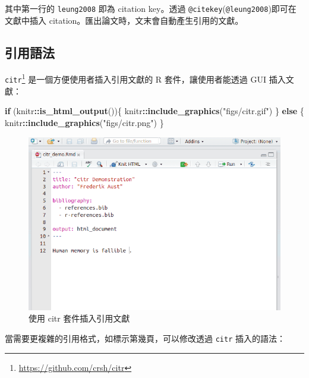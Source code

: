 \documentclass[oneside]{book}
\newenvironment{Shaded}{\begin{snugshade}}{\end{snugshade}}
\newcommand{\KeywordTok}[1]{\textcolor[rgb]{0.13,0.29,0.53}{\textbf{#1}}}
\newcommand{\StringTok}[1]{\textcolor[rgb]{0.31,0.60,0.02}{#1}}
\newcommand{\ControlFlowTok}[1]{\textcolor[rgb]{0.13,0.29,0.53}{\textbf{#1}}}
\newcommand{\OperatorTok}[1]{\textcolor[rgb]{0.81,0.36,0.00}{\textbf{#1}}}
\newcommand{\NormalTok}[1]{#1}
\renewcommand{\href}[2]{#2\footnote{\url{#1}}}
\theoremstyle{definition}
\theoremstyle{definition}
\theoremstyle{definition}
\theoremstyle{remark}
\begin{document}
其中第一行的 \texttt{leung2008} 即為 citation key。透過
\texttt{@citekey}(\texttt{@leung2008})即可在文獻中插入
citation。匯出論文時，文末會自動產生引用的文獻。

\subsection{引用語法}\label{cite-syntax}

\href{https://github.com/crsh/citr}{\texttt{citr}}
是一個方便使用者插入引用文獻的 R 套件，讓使用者能透過 GUI 插入文獻：

\begin{Shaded}
\begin{Highlighting}[]
\ControlFlowTok{if}\NormalTok{ (knitr}\OperatorTok{::}\KeywordTok{is_html_output}\NormalTok{())\{}
\NormalTok{  knitr}\OperatorTok{::}\KeywordTok{include_graphics}\NormalTok{(}\StringTok{"figs/citr.gif"}\NormalTok{)}
\NormalTok{\} }\ControlFlowTok{else}\NormalTok{ \{}
\NormalTok{  knitr}\OperatorTok{::}\KeywordTok{include_graphics}\NormalTok{(}\StringTok{"figs/citr.png"}\NormalTok{)}
\NormalTok{\}}
\end{Highlighting}
\end{Shaded}

\begin{figure}[H]

{\centering \includegraphics[width=1\linewidth]{figs/citr} 

}

\caption{使用 citr 套件插入引用文獻}\label{fig:unnamed-chunk-5}
\end{figure}

當需要更複雜的引用格式，如標示第幾頁，可以修改透過 \texttt{citr}
插入的語法：
\end{document}
